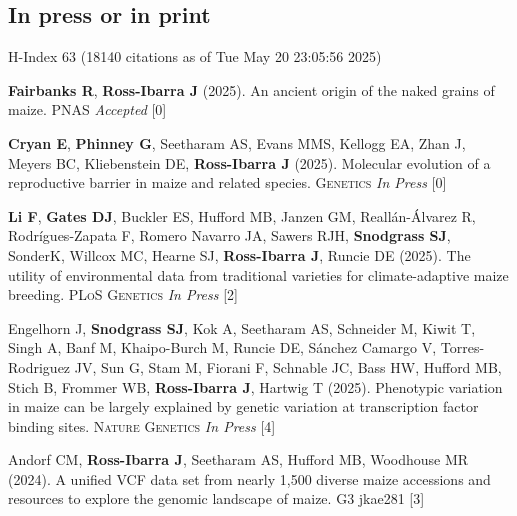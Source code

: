 \documentclass[letterpaper,10pt]{article}
\begin{document}
\subsection*{In press or in print} %
 {\small H-Index 63 (18140 citations as of Tue May 20 23:05:56 2025)}

\begin{etaremune}
\setlength\itemsep{0ex}

\item \textbf{Fairbanks R}, \textbf{Ross-Ibarra J} (2025). An ancient origin of the naked grains of maize. \textsc{PNAS} \textit{Accepted}%
 [0]\\

\item \textbf{Cryan E}, \textbf{Phinney G}, Seetharam AS, Evans MMS, Kellogg EA, Zhan J, Meyers BC,  Kliebenstein DE, \textbf{Ross-Ibarra J} (2025). Molecular evolution of a reproductive barrier in maize and related species. \textsc{Genetics} \textit{In Press} %
 [0]\\

\item \textbf{Li F}, \textbf{Gates DJ}, Buckler ES, Hufford MB, Janzen GM, Reall\'an-\'Alvarez R, Rodr\'igues-Zapata F, Romero Navarro JA, Sawers RJH, \textbf{Snodgrass SJ}, SonderK, Willcox MC, Hearne SJ, \textbf{Ross-Ibarra J}, Runcie DE (2025).  The utility of environmental data from traditional varieties for climate-adaptive maize breeding. \textsc{PLoS Genetics} \textit{In Press} %
 [2]\\

\item Engelhorn J, \textbf{Snodgrass SJ}, Kok A, Seetharam AS, Schneider M, Kiwit T, Singh A, Banf M, Khaipo-Burch M, Runcie DE, Sánchez Camargo V, Torres-Rodriguez JV, Sun G, Stam M, Fiorani F, Schnable JC, Bass HW, Hufford MB, Stich B, Frommer WB, \textbf{Ross-Ibarra J}, Hartwig T (2025). Phenotypic variation in maize can be largely explained by genetic variation at transcription factor binding sites. \textsc{Nature Genetics} \textit{In Press}
 [4]\\

\item Andorf CM, \textbf{Ross-Ibarra J}, Seetharam AS, Hufford MB,  Woodhouse MR (2024). A unified VCF data set from nearly 1,500 diverse maize accessions and resources to explore the genomic landscape of maize. \textsc{G3} jkae281
 [3]\\


\end{etaremune}
\end{document}
